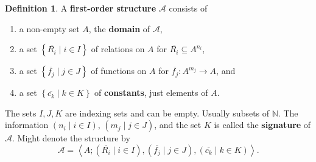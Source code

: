 \documentclass{article}
\newcommand{\N}{\mathbb{N}}
\newcommand{\rb}[1]{\left( #1 \right)}
\newcommand{\cb}[1]{\left\{ #1 \right\}}
\newcommand{\ab}[1]{\left\langle #1 \right\rangle}
\theoremstyle{definition}\newtheorem{definition}{Definition}[subsection]
\theoremstyle{definition}\newtheorem{remark}[definition]{Remark}
\theoremstyle{definition}\newtheorem*{example}{Example}
\theoremstyle{definition}\newtheorem*{note}{Note}
\begin{document}
\begin{definition}
A \textbf{first-order structure} $ \mathcal{A} $ consists of
\begin{enumerate}
\item a non-empty set $ A $, the \textbf{domain} of $ \mathcal{A} $,
\item a set $ \cb{\overline{R_i} \mid i \in I} $ of relations on $ A $ for $ \overline{R_i} \subseteq A^{n_i} $,
\item a set $ \cb{\overline{f_j} \mid j \in J} $ of functions on $ A $ for $ \overline{f_j} : A^{m_j} \to A $, and
\item a set $ \cb{\overline{c_k} \mid k \in K} $ of \textbf{constants}, just elements of $ A $.
\end{enumerate}
The sets $ I, J, K $ are indexing sets and can be empty. Usually subsets of $ \N $. The information $ \rb{n_i \mid i \in I} $, $ \rb{m_j \mid j \in J} $, and the set $ K $ is called the \textbf{signature} of $ \mathcal{A} $. Might denote the structure by
$$ \mathcal{A} = \ab{A; \rb{\overline{R_i} \mid i \in I}, \rb{\overline{f_j} \mid j \in J}, \rb{\overline{c_k} \mid k \in K}}. $$
\end{definition}
\end{document}
